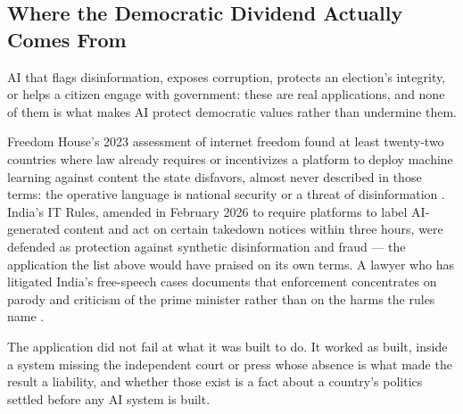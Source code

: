 \subsection{Where the Democratic Dividend Actually Comes From}
\label{sec:12.1.1}
AI that flags disinformation, exposes corruption, protects an election's integrity, or helps a citizen engage with government: these are real applications, and none of them is what makes AI protect democratic values rather than undermine them.

Freedom House's 2023 assessment of internet freedom found at least twenty-two countries where law already requires or incentivizes a platform to deploy machine learning against content the state disfavors, almost never described in those terms: the operative language is national security or a threat of disinformation \autocite{funk2023freedom}. India's IT Rules, amended in February 2026 to require platforms to label AI-generated content and act on certain takedown notices within three hours, were defended as protection against synthetic disinformation and fraud — the application the list above would have praised on its own terms. A lawyer who has litigated India's free-speech cases documents that enforcement concentrates on parody and criticism of the prime minister rather than on the harms the rules name \autocite{gupta2026three}.

The application did not fail at what it was built to do. It worked as built, inside a system missing the independent court or press whose absence is what made the result a liability, and whether those exist is a fact about a country's politics settled before any AI system is built.
